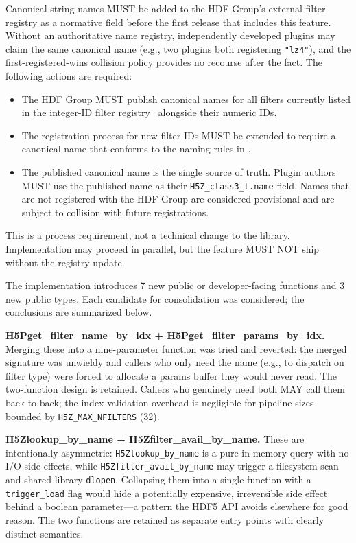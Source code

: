 \documentclass[../HDF5_RFC.tex]{subfiles}
\begin{document}
Canonical string names MUST be added to the HDF Group's external filter
registry as a normative field before the first release that includes
this feature. Without an authoritative name registry, independently
developed plugins may claim the same canonical name (e.g., two plugins both
registering \texttt{"lz4"}), and the first-registered-wins collision policy
provides no recourse after the fact. The following actions are required:
\begin{itemize}
\item The HDF Group MUST publish canonical names for all filters currently
  listed in the integer-ID filter registry~\cite{hdf5registeredfilters}
  alongside their numeric IDs.
\item The registration process for new filter IDs MUST be extended to
  require a canonical name that conforms to the naming rules in
  .
\item The published canonical name is the single source of truth. Plugin
  authors MUST use the published name as their \texttt{H5Z\_class3\_t.name}
  field. Names that are not registered with the HDF Group are considered
  provisional and are subject to collision with future registrations.
\end{itemize}
This is a process requirement, not a technical change to the library.
Implementation may proceed in parallel, but the feature MUST NOT ship
without the registry update.

The implementation introduces 7 new public or developer-facing functions and 3
new public types.  Each candidate for consolidation was considered; the
conclusions are summarized below.

\textbf{H5Pget\_filter\_name\_by\_idx + H5Pget\_filter\_params\_by\_idx.}
Merging these into a nine-parameter function was tried and reverted: the merged signature was unwieldy and callers who
only need the name (e.g., to dispatch on filter type) were forced to allocate a
params buffer they would never read.  The two-function design is retained.
Callers who genuinely need both MAY call them back-to-back; the index
validation overhead is negligible for pipeline sizes bounded by
\texttt{H5Z\_MAX\_NFILTERS} (32).

\textbf{H5Zlookup\_by\_name + H5Zfilter\_avail\_by\_name.}
These are intentionally asymmetric: \texttt{H5Zlookup\_by\_name} is a pure
in-memory query with no I/O side effects, while \texttt{H5Zfilter\_avail\_by\_name}
may trigger a filesystem scan and shared-library \texttt{dlopen}.  Collapsing them
into a single function with a \texttt{trigger\_load} flag would hide a potentially
expensive, irreversible side effect behind a boolean parameter---a pattern the
HDF5 API avoids elsewhere for good reason.  The two functions are retained as
separate entry points with clearly distinct semantics.
\end{document}
